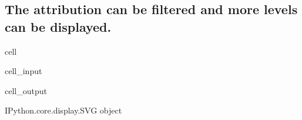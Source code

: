 \documentclass[letterpaper,10pt,english]{jupyterBook}
\begin{document}
\subsection{The attribution can be filtered and more levels can be displayed.}
\label{\detokenize{content/howto/attribution/Attribution background:the-attribution-can-be-filtered-and-more-levels-can-be-displayed}}
\begin{sphinxuseclass}{cell}\begin{sphinxVerbatimInput}

\begin{sphinxuseclass}{cell_input}
\begin{sphinxVerbatim}[commandchars=\\\{\}]
\PYG{p}{[}\PYG{p}{]} 
\end{sphinxVerbatim}

\end{sphinxuseclass}\end{sphinxVerbatimInput}
\begin{sphinxVerbatimOutput}

\begin{sphinxuseclass}{cell_output}
\begin{sphinxVerbatim}[commandchars=\\\{\}]
\PYGZlt{}IPython.core.display.SVG object\PYGZgt{}
\end{sphinxVerbatim}

\end{sphinxuseclass}\end{sphinxVerbatimOutput}

\end{sphinxuseclass}
\end{document}
